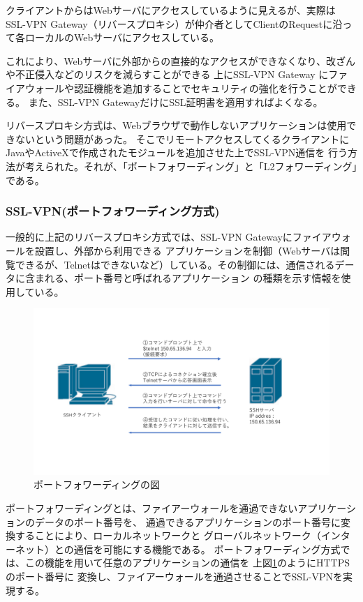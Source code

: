 \documentclass[11pt,a4j,titlepage]{jreport}
\begin{document}
クライアントからはWebサーバにアクセスしているように見えるが、実際は
SSL-VPN Gateway（リバースプロキシ）が仲介者としてClientのRequestに沿って各ローカルのWebサーバにアクセスしている。

これにより、Webサーバに外部からの直接的なアクセスができなくなり、改ざんや不正侵入などのリスクを減らすことができる
上にSSL-VPN Gateway にファイアウォールや認証機能を追加することでセキュリティの強化を行うことができる。
また、SSL-VPN GatewayだけにSSL証明書を適用すればよくなる。

リバースプロキシ方式は、Webブラウザで動作しないアプリケーションは使用できないという問題があった。
そこでリモートアクセスしてくるクライアントにJavaやActiveXで作成されたモジュールを追加させた上でSSL-VPN通信を
行う方法が考えられた。それが、「ポートフォワーディング」と「L2フォワーディング」である。

\subsubsection*{SSL-VPN(ポートフォワーディング方式)}

一般的に上記のリバースプロキシ方式では、SSL-VPN Gatewayにファイアウォールを設置し、外部から利用できる
アプリケーションを制御（Webサーバは閲覧できるが、Telnetはできないなど）している。その制御には、通信されるデータに含まれる、ポート番号と呼ばれるアプリケーション
の種類を示す情報を使用している。
\begin{figure}[h]
    \centering
    \includegraphics[width=1.0\textwidth, page=17]{graphs/network_archtecture.pdf}
    \caption{ポートフォワーディングの図}
    \label{portfowarding}
\end{figure}

ポートフォワーディングとは、ファイアーウォールを通過できないアプリケーションのデータのポート番号を、
通過できるアプリケーションのポート番号に変換することにより、ローカルネットワークと
グローバルネットワーク（インターネット）との通信を可能にする機能である。
ポートフォワーディング方式では、この機能を用いて任意のアプリケーションの通信を
上図\ref{portfowarding}のようにHTTPSのポート番号に
変換し、ファイアーウォールを通過させることでSSL-VPNを実現する。
\end{document}
